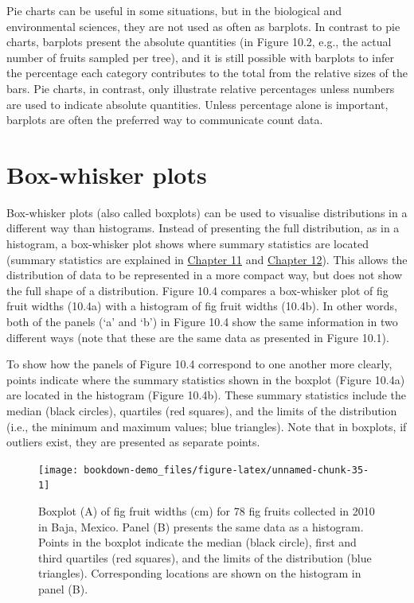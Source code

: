\documentclass[
  openany]{scrbook}
\begin{document}
Pie charts can be useful in some situations, but in the biological and environmental sciences, they are not used as often as barplots.
In contrast to pie charts, barplots present the absolute quantities (in Figure 10.2, e.g., the actual number of fruits sampled per tree), and it is still possible with barplots to infer the percentage each category contributes to the total from the relative sizes of the bars.
Pie charts, in contrast, only illustrate relative percentages unless numbers are used to indicate absolute quantities.
Unless percentage alone is important, barplots are often the preferred way to communicate count data.

\hypertarget{box-whisker-plots}{%
\section{Box-whisker plots}\label{box-whisker-plots}}

Box-whisker plots (also called boxplots) can be used to visualise distributions in a different way than histograms.
Instead of presenting the full distribution, as in a histogram, a box-whisker plot shows where summary statistics are located (summary statistics are explained in \protect\hyperlink{Chapter_11}{Chapter 11} and \protect\hyperlink{Chapter_12}{Chapter 12}).
This allows the distribution of data to be represented in a more compact way, but does not show the full shape of a distribution.
Figure 10.4 compares a box-whisker plot of fig fruit widths (10.4a) with a histogram of fig fruit widths (10.4b).
In other words, both of the panels (`a' and `b') in Figure 10.4 show the same information in two different ways (note that these are the same data as presented in Figure 10.1).

To show how the panels of Figure 10.4 correspond to one another more clearly, points indicate where the summary statistics shown in the boxplot (Figure 10.4a) are located in the histogram (Figure 10.4b).
These summary statistics include the median (black circles), quartiles (red squares), and the limits of the distribution (i.e., the minimum and maximum values; blue triangles).
Note that in boxplots, if outliers exist, they are presented as separate points.

\begin{figure}
\texttt{[image: bookdown-demo\_files/figure-latex/unnamed-chunk-35-1]} \caption{Boxplot (A) of fig fruit widths (cm) for 78 fig fruits collected in 2010 in Baja, Mexico. Panel (B) presents the same data as a histogram. Points in the boxplot indicate the median (black circle), first and third quartiles (red squares), and the limits of the distribution (blue triangles). Corresponding locations are shown on the histogram in panel (B).}\label{fig:unnamed-chunk-35}
\end{figure}
\end{document}
